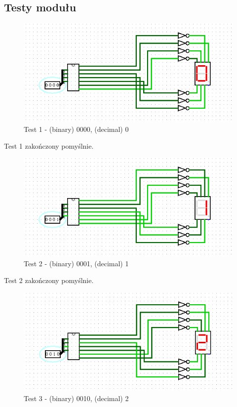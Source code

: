 \subsection{Testy modułu}\label{subsec:module-tests}
\begin{figure}[h]
    \includegraphics[width=\linewidth]{ScreenshotsTests/Comp 1/Comp 1_00009.png}
    \caption{Test 1 - (binary) 0000, (decimal) 0}
    \label{fig:test0}
\end{figure}

Test 1 zakończony pomyślnie.

\begin{figure}[H]
    \includegraphics[width=\linewidth]{ScreenshotsTests/Comp 1/Comp 1_00008.png}
    \caption{Test 2 - (binary) 0001, (decimal) 1}
    \label{fig:test1}
\end{figure}

Test 2 zakończony pomyślnie.

\begin{figure}[H]
    \includegraphics[width=\linewidth]{ScreenshotsTests/Comp 1/Comp 1_00007.png}
    \caption{Test 3 - (binary) 0010, (decimal) 2}
    \label{fig:test2}
\end{figure}

